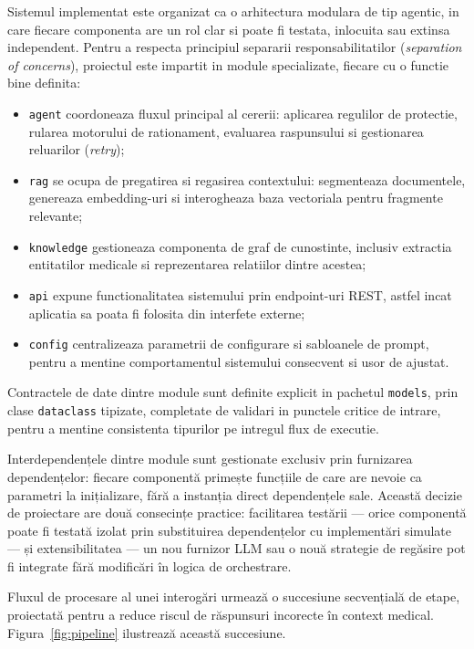 \documentclass[12pt, a4paper, oneside, romanian]{teza-upb}
\begin{document}
Sistemul implementat este organizat ca o arhitectura modulara de tip agentic, in care fiecare componenta are un rol clar si poate fi testata, inlocuita sau extinsa independent. Pentru a respecta principiul separarii responsabilitatilor (\textit{separation of concerns}), proiectul este impartit in module specializate, fiecare cu o functie bine definita:
\begin{itemize}
    \item \texttt{agent} coordoneaza fluxul principal al cererii: aplicarea regulilor de protectie, rularea motorului de rationament, evaluarea raspunsului si gestionarea reluarilor (\textit{retry});
    \item \texttt{rag} se ocupa de pregatirea si regasirea contextului: segmenteaza documentele, genereaza embedding-uri si interogheaza baza vectoriala pentru fragmente relevante;
    \item \texttt{knowledge} gestioneaza componenta de graf de cunostinte, inclusiv extractia entitatilor medicale si reprezentarea relatiilor dintre acestea;
    \item \texttt{api} expune functionalitatea sistemului prin endpoint-uri REST, astfel incat aplicatia sa poata fi folosita din interfete externe;
    \item \texttt{config} centralizeaza parametrii de configurare si sabloanele de prompt, pentru a mentine comportamentul sistemului consecvent si usor de ajustat.
\end{itemize}
Contractele de date dintre module sunt definite explicit in pachetul \texttt{models}, prin clase \texttt{dataclass} tipizate, completate de validari in punctele critice de intrare, pentru a mentine consistenta tipurilor pe intregul flux de executie.

Interdependențele dintre module sunt gestionate exclusiv prin furnizarea dependențelor: fiecare componentă primește funcțiile de care are nevoie ca parametri la inițializare, fără a instanția direct dependențele sale. Această decizie de proiectare are două consecințe practice: facilitarea testării — orice componentă poate fi testată izolat prin substituirea dependențelor cu implementări simulate — și extensibilitatea — un nou furnizor LLM sau o nouă strategie de regăsire pot fi integrate fără modificări în logica de orchestrare.

Fluxul de procesare al unei interogări urmează o succesiune secvențială de etape, proiectată pentru a reduce riscul de răspunsuri incorecte în context medical. Figura~\ref{fig:pipeline} ilustrează această succesiune.
\end{document}
